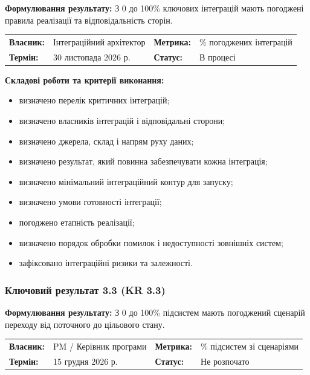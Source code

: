 \documentclass{article}
\begin{document}
\textbf{Формулювання результату:} З 0 до 100\% ключових інтеграцій мають погоджені правила реалізації та відповідальність сторін.

\noindent\begin{tabular}{@{}p{2.2cm}p{4.5cm}p{2.2cm}p{4.5cm}@{}}
\toprule
\textbf{Власник:} & Інтеграційний архітектор & \textbf{Метрика:} & \% погоджених інтеграцій \\
\textbf{Термін:} & 30 листопада 2026 р. & \textbf{Статус:} & В процесі \\
\bottomrule
\end{tabular}

\vspace{10pt}
\textbf{Складові роботи та критерії виконання:}
\begin{itemize}
    \item визначено перелік критичних інтеграцій;
    \item визначено власників інтеграцій і відповідальні сторони;
    \item визначено джерела, склад і напрям руху даних;
    \item визначено результат, який повинна забезпечувати кожна інтеграція;
    \item визначено мінімальний інтеграційний контур для запуску;
    \item визначено умови готовності інтеграції;
    \item погоджено етапність реалізації;
    \item визначено порядок обробки помилок і недоступності зовнішніх систем;
    \item зафіксовано інтеграційні ризики та залежності.
\end{itemize}

\subsubsection{Ключовий результат 3.3 (KR 3.3)}

\textbf{Формулювання результату:} З 0 до 100\% підсистем мають погоджений сценарій переходу від поточного до цільового стану.

\noindent\begin{tabular}{@{}p{2.2cm}p{4.5cm}p{2.2cm}p{4.5cm}@{}}
\toprule
\textbf{Власник:} & PM / Керівник програми & \textbf{Метрика:} & \% підсистем зі сценаріями \\
\textbf{Термін:} & 15 грудня 2026 р. & \textbf{Статус:} & Не розпочато \\
\bottomrule
\end{tabular}
\end{document}
